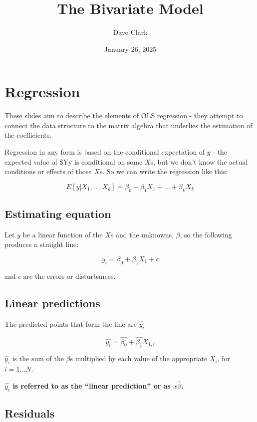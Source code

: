 \documentclass[
  letterpaper,
  DIV=11,
  numbers=noendperiod]{scrartcl}
\title{The Bivariate Model}
\author{Dave Clark}
\date{January 26, 2025}
\begin{document}
\maketitle


\section{Regression}\label{regression}

These slides aim to describe the elements of OLS regression - they
attempt to connect the data structure to the matrix algebra that
underlies the estimation of the coefficients.

Regression in any form is based on the conditional expectation of \(y\)
- the expected value of \$Yy is conditional on some \(X\)s, but we don't
know the actual conditions or effects of those \(X\)s. So we can write
the regression like this:

\[E[y|X_{1}, \ldots,X_{k}]= \beta_{0}+\beta_{1}X_{1}+\ldots+\beta_{k}X_{k}\]

\subsection{Estimating equation}\label{estimating-equation}

\noindent Let \(y\) be a linear function of the \(X\)s and the unknowns,
\(\beta\), so the following produces a straight line:

\[y_{i}=\beta_{0}+\beta_{1}X_{1} + \epsilon \]

and \(\epsilon\) are the errors or disturbances.

\subsection{Linear predictions}\label{linear-predictions}

The predicted points that form the line are \(\widehat{y_{i}}\)

\[\widehat{y_{i}}=\widehat{\beta_{0}}+\widehat{\beta_{1}}X_{1,i}\]

\(\widehat{y_{i}}\) is the sum of the \(\beta\)s multiplied by each
value of the appropriate \(X_i\), for \(i=1 \ldots N\).

\textbf{\(\widehat{y_{i}}\) is referred to as the ``linear prediction''
or as \(x\hat{\beta}\).}

\subsection{Residuals}\label{residuals}
\end{document}

